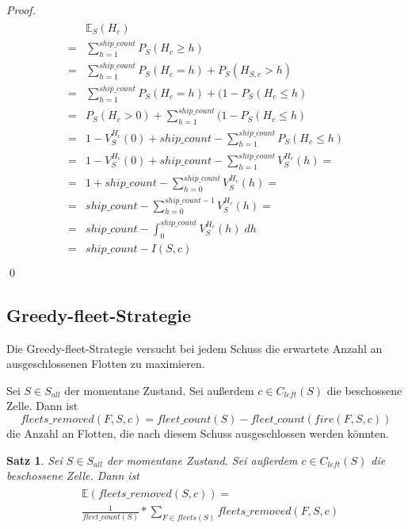 \documentclass[a4paper,12pt]{llncs}
\numberwithin{equation}{section}
\newtheorem{satz}{Satz}
\begin{document}
\begin{proof}
\begin{align}
\begin{split}
&\mathds{E}_S(H_{c})\\
=&\sum_{h=1}^{ship\_count} P_S(H_{c} \geq h)\\
=&\sum_{h=1}^{ship\_count} P_S(H_{c}=h) + P_S(H_{S,c} > h)\\
=&\sum_{h=1}^{ship\_count} P_S(H_{c}=h) + (1 - P_S(H_{c} \leq h)\\
=&P_S(H_{c} > 0) + \sum_{h=1}^{ship\_count} (1 - P_S(H_{c} \leq h)\\
=&1 - V_S^{H_{c}}(0) + ship\_count - \sum_{h=1}^{ship\_count} P_S(H_{c} \leq h)\\
=&1 - V_S^{H_{c}}(0) + ship\_count - \sum_{h=1}^{ship\_count} V_S^{H_{c}}(h)=\\
=&1 + ship\_count - \sum_{h=0}^{ship\_count} V_S^{H_{c}}(h)=\\
=&ship\_count - \sum_{h=0}^{ship\_count - 1} V_S^{H_{c}}(h)=\\
=&ship\_count - \int_{0}^{ship\_count} V_S^{H_{c}}(h) \; dh\\
=&ship\_count - I(S,c)\\
\end{split}
\end{align}
\qed
\end{proof}

\subsection{Greedy-fleet-Strategie}
Die Greedy-fleet-Strategie versucht bei jedem Schuss die erwartete Anzahl an ausgeschlossenen Flotten zu maximieren.

\begin{definition}
Sei $S\in S_{all}$ der momentane Zustand.
Sei außerdem $c \in C_{left}(S)$ die beschossene Zelle.
Dann ist
\[
fleets\_removed(F, S, c)=fleet\_count(S) - fleet\_count(fire(F, S,c))
\]
die Anzahl an Flotten, die nach diesem Schuss ausgeschlossen werden könnten.
\end{definition}

\begin{satz}
Sei $S\in S_{all}$ der momentane Zustand.
Sei außerdem $c \in C_{left}(S)$ die beschossene Zelle.
Dann ist
\begin{align}
\begin{split}
&\mathds{E}(fleets\_removed(S,c))=\\
&\frac{1}{fleet\_count(S)} * \sum_{F \in fleets(S)} fleets\_removed(F, S, c) \nonumber
\end{split}
\end{align}
\end{satz}
\end{document}
